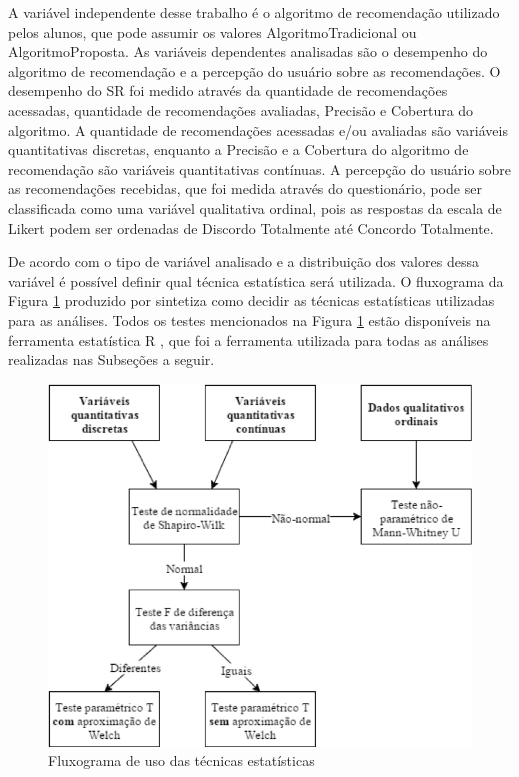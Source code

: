 A variável independente desse trabalho é o algoritmo de recomendação utilizado pelos alunos, que pode assumir os valores
AlgoritmoTradicional ou AlgoritmoProposta. As variáveis dependentes analisadas são o
desempenho do algoritmo de recomendação e a percepção do usuário sobre as recomendações. O desempenho do SR
foi medido através da quantidade de recomendações acessadas, quantidade de recomendações avaliadas, Precisão e Cobertura do
algoritmo. A quantidade de recomendações acessadas e/ou avaliadas são variáveis quantitativas discretas,
enquanto a Precisão e a Cobertura do algoritmo de recomendação são variáveis quantitativas contínuas. A percepção do usuário sobre
as recomendações recebidas, que foi medida através do questionário, pode ser classificada como uma variável
qualitativa ordinal, pois as respostas da escala de Likert podem ser ordenadas de Discordo Totalmente até Concordo Totalmente.

De acordo com o tipo de variável analisado e a distribuição dos valores dessa variável é possível definir qual técnica
estatística será utilizada. O fluxograma da Figura \ref{fig:fluxograma-tecnica-moissa} produzido por 
sintetiza como decidir as técnicas estatísticas utilizadas para as análises. Todos os testes mencionados na Figura \ref{fig:fluxograma-tecnica-moissa}
estão disponíveis na ferramenta estatística R \cite{rstatisticalcomputing2018}, que foi a ferramenta utilizada para todas as análises realizadas nas
Subseções a seguir.

\begin{figure}[htb]
  \caption{\label{fig:fluxograma-tecnica-moissa}Fluxograma de uso das técnicas estatísticas}
  \begin{center}
      \includegraphics[scale=1.0]{./Figuras/fluxograma-tecnicas-moissa.png}
  \end{center}
\end{figure}

